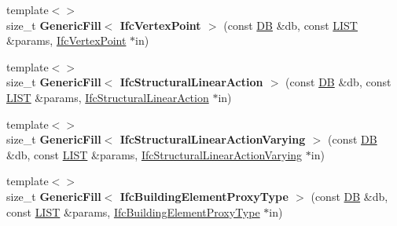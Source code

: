 \begin{DoxyCompactItemize}
\item 
\hypertarget{namespace_assimp_1_1_s_t_e_p_a5d910b8cfcfa74750b680bb68fc8467e}{{\footnotesize template$<$$>$ }\\size\+\_\+t {\bfseries Generic\+Fill$<$ Ifc\+Vertex\+Point $>$} (const \hyperlink{class_assimp_1_1_s_t_e_p_1_1_d_b}{D\+B} \&db, const \hyperlink{class_assimp_1_1_s_t_e_p_1_1_e_x_p_r_e_s_s_1_1_l_i_s_t}{L\+I\+S\+T} \&params, \hyperlink{struct_assimp_1_1_i_f_c_1_1_ifc_vertex_point}{Ifc\+Vertex\+Point} $\ast$in)}\label{namespace_assimp_1_1_s_t_e_p_a5d910b8cfcfa74750b680bb68fc8467e}

\item 
\hypertarget{namespace_assimp_1_1_s_t_e_p_a667edccaee83a5f0269986a6dcbf6f91}{{\footnotesize template$<$$>$ }\\size\+\_\+t {\bfseries Generic\+Fill$<$ Ifc\+Structural\+Linear\+Action $>$} (const \hyperlink{class_assimp_1_1_s_t_e_p_1_1_d_b}{D\+B} \&db, const \hyperlink{class_assimp_1_1_s_t_e_p_1_1_e_x_p_r_e_s_s_1_1_l_i_s_t}{L\+I\+S\+T} \&params, \hyperlink{struct_assimp_1_1_i_f_c_1_1_ifc_structural_linear_action}{Ifc\+Structural\+Linear\+Action} $\ast$in)}\label{namespace_assimp_1_1_s_t_e_p_a667edccaee83a5f0269986a6dcbf6f91}

\item 
\hypertarget{namespace_assimp_1_1_s_t_e_p_a41c935fb34346488895e4de9e412ce5c}{{\footnotesize template$<$$>$ }\\size\+\_\+t {\bfseries Generic\+Fill$<$ Ifc\+Structural\+Linear\+Action\+Varying $>$} (const \hyperlink{class_assimp_1_1_s_t_e_p_1_1_d_b}{D\+B} \&db, const \hyperlink{class_assimp_1_1_s_t_e_p_1_1_e_x_p_r_e_s_s_1_1_l_i_s_t}{L\+I\+S\+T} \&params, \hyperlink{struct_assimp_1_1_i_f_c_1_1_ifc_structural_linear_action_varying}{Ifc\+Structural\+Linear\+Action\+Varying} $\ast$in)}\label{namespace_assimp_1_1_s_t_e_p_a41c935fb34346488895e4de9e412ce5c}

\item 
\hypertarget{namespace_assimp_1_1_s_t_e_p_a67b17ff09d2c4a876edc7f9b00c8762e}{{\footnotesize template$<$$>$ }\\size\+\_\+t {\bfseries Generic\+Fill$<$ Ifc\+Building\+Element\+Proxy\+Type $>$} (const \hyperlink{class_assimp_1_1_s_t_e_p_1_1_d_b}{D\+B} \&db, const \hyperlink{class_assimp_1_1_s_t_e_p_1_1_e_x_p_r_e_s_s_1_1_l_i_s_t}{L\+I\+S\+T} \&params, \hyperlink{struct_assimp_1_1_i_f_c_1_1_ifc_building_element_proxy_type}{Ifc\+Building\+Element\+Proxy\+Type} $\ast$in)}\label{namespace_assimp_1_1_s_t_e_p_a67b17ff09d2c4a876edc7f9b00c8762e}


\end{DoxyCompactItemize}
